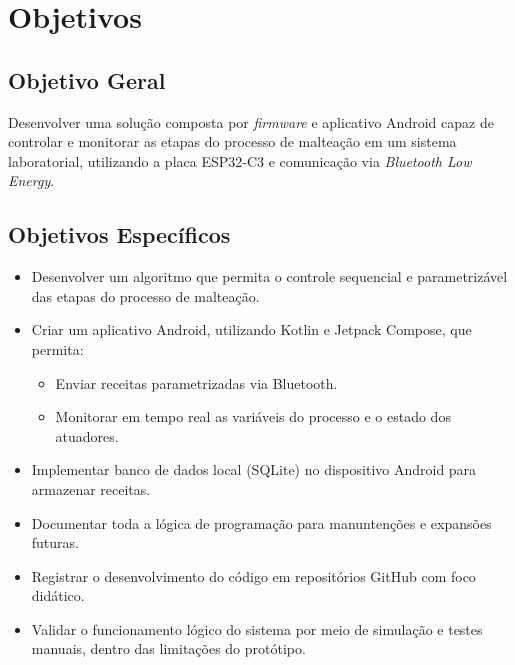 \chapter[Objetivos]{Objetivos}

\section{Objetivo Geral}

Desenvolver uma solução composta por \textit{firmware} e aplicativo Android capaz de controlar e monitorar as etapas do processo de malteação em um sistema laboratorial, utilizando a placa ESP32-C3 e comunicação via \textit{Bluetooth Low Energy}.

\section{Objetivos Específicos}

\begin{itemize}
    \item Desenvolver um algoritmo que permita o controle sequencial e parametrizável das etapas do processo de malteação.
    \item Criar um aplicativo Android, utilizando Kotlin e Jetpack Compose, que permita:
    \begin{itemize}
        \item Enviar receitas parametrizadas via Bluetooth.
        \item Monitorar em tempo real as variáveis do processo e o estado dos atuadores.
    \end{itemize}
    \item Implementar banco de dados local (SQLite) no dispositivo Android para armazenar receitas.
    \item Documentar toda a lógica de programação para manuntenções e expansões futuras.
    \item Registrar o desenvolvimento do código em repositórios GitHub com foco didático.
    \item Validar o funcionamento lógico do sistema por meio de simulação e testes manuais, dentro das limitações do protótipo.
\end{itemize}